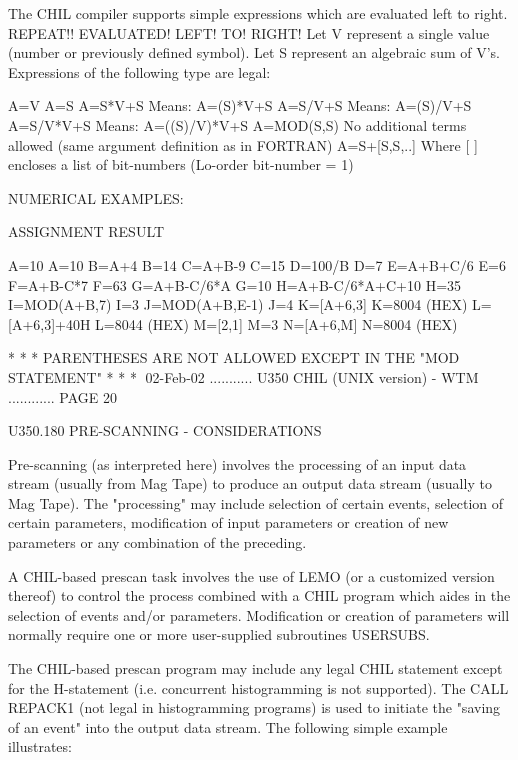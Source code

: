    The CHIL compiler supports simple expressions which are evaluated  left  to
   right.  REPEAT!! EVALUATED! LEFT! TO! RIGHT! Let V represent a single value
   (number or previously defined symbol). Let S represent an algebraic sum  of
   V's. Expressions of the following type are legal:
 
   A=V
   A=S
   A=S*V+S                Means: A=(S)*V+S
   A=S/V+S                Means: A=(S)/V+S
   A=S/V*V+S              Means: A=((S)/V)*V+S
   A=MOD(S,S)             No additional terms allowed
                          (same argument definition as in FORTRAN)
   A=S+[S,S,..]           Where [ ] encloses a list of bit-numbers
                          (Lo-order bit-number = 1)
 
   NUMERICAL EXAMPLES:
 
   ASSIGNMENT             RESULT
 
   A=10                   A=10
   B=A+4                  B=14
   C=A+B-9                C=15
   D=100/B                D=7
   E=A+B+C/6              E=6
   F=A+B-C*7              F=63
   G=A+B-C/6*A            G=10
   H=A+B-C/6*A+C+10       H=35
   I=MOD(A+B,7)           I=3
   J=MOD(A+B,E-1)         J=4
   K=[A+6,3]              K=8004 (HEX)
   L=[A+6,3]+40H          L=8044 (HEX)
   M=[2,1]                M=3
   N=[A+6,M]              N=8004 (HEX)
 
      * * * PARENTHESES ARE NOT ALLOWED EXCEPT IN THE "MOD STATEMENT" * * *
    
   02-Feb-02 ........... U350  CHIL (UNIX version) - WTM ............ PAGE  20
 
 
 
   U350.180  PRE-SCANNING - CONSIDERATIONS
 
   Pre-scanning  (as  interpreted  here)  involves  the processing of an input
   data stream (usually from Mag  Tape)  to  produce  an  output  data  stream
   (usually  to  Mag  Tape). The "processing" may include selection of certain
   events, selection of certain parameters, modification of  input  parameters
   or creation of new parameters or any combination of the preceding.
 
   A  CHIL-based  prescan  task  involves  the  use  of  LEMO (or a customized
   version thereof) to control the process combined with a CHIL program  which
   aides  in  the  selection  of  events  and/or  parameters.  Modification or
   creation of parameters will normally  require  one  or  more  user-supplied
   subroutines USERSUBS.
 
   The  CHIL-based prescan program may include any legal CHIL statement except
   for the H-statement (i.e. concurrent histogramming is not  supported).  The
   CALL  REPACK1 (not legal in histogramming programs) is used to initiate the
   "saving of an event" into the output  data  stream.  The  following  simple
   example illustrates:
 
